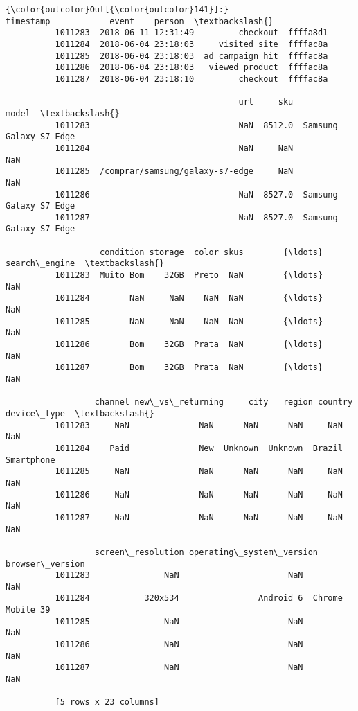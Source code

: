 \documentclass[11pt]{article}
\begin{document}
\begin{Verbatim}[commandchars=\\\{\}]
{\color{outcolor}Out[{\color{outcolor}141}]:}                    timestamp            event    person  \textbackslash{}
          1011283  2018-06-11 12:31:49         checkout  ffffa8d1   
          1011284  2018-06-04 23:18:03     visited site  ffffac8a   
          1011285  2018-06-04 23:18:03  ad campaign hit  ffffac8a   
          1011286  2018-06-04 23:18:03   viewed product  ffffac8a   
          1011287  2018-06-04 23:18:10         checkout  ffffac8a   
          
                                               url     sku                   model  \textbackslash{}
          1011283                              NaN  8512.0  Samsung Galaxy S7 Edge   
          1011284                              NaN     NaN                     NaN   
          1011285  /comprar/samsung/galaxy-s7-edge     NaN                     NaN   
          1011286                              NaN  8527.0  Samsung Galaxy S7 Edge   
          1011287                              NaN  8527.0  Samsung Galaxy S7 Edge   
          
                   condition storage  color skus        {\ldots}        search\_engine  \textbackslash{}
          1011283  Muito Bom    32GB  Preto  NaN        {\ldots}                  NaN   
          1011284        NaN     NaN    NaN  NaN        {\ldots}                  NaN   
          1011285        NaN     NaN    NaN  NaN        {\ldots}                  NaN   
          1011286        Bom    32GB  Prata  NaN        {\ldots}                  NaN   
          1011287        Bom    32GB  Prata  NaN        {\ldots}                  NaN   
          
                  channel new\_vs\_returning     city   region country device\_type  \textbackslash{}
          1011283     NaN              NaN      NaN      NaN     NaN         NaN   
          1011284    Paid              New  Unknown  Unknown  Brazil  Smartphone   
          1011285     NaN              NaN      NaN      NaN     NaN         NaN   
          1011286     NaN              NaN      NaN      NaN     NaN         NaN   
          1011287     NaN              NaN      NaN      NaN     NaN         NaN   
          
                  screen\_resolution operating\_system\_version   browser\_version  
          1011283               NaN                      NaN               NaN  
          1011284           320x534                Android 6  Chrome Mobile 39  
          1011285               NaN                      NaN               NaN  
          1011286               NaN                      NaN               NaN  
          1011287               NaN                      NaN               NaN  
          
          [5 rows x 23 columns]
\end{Verbatim}
            
\end{document}
